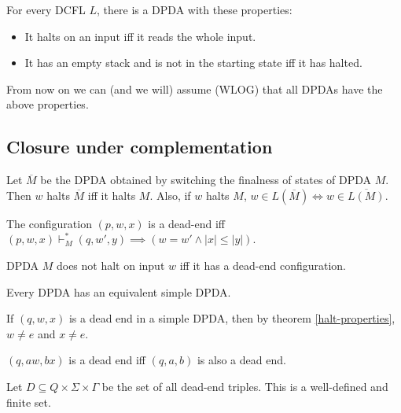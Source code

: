 \begin{theorem}
\label{halt-properties}
For every DCFL $L$,
there is a DPDA with these properties:
\begin{itemize}
\item It halts on an input iff it reads the whole input.
\item It has an empty stack and is not in the starting state iff it has halted.
\end{itemize}
\end{theorem}
From now on we can (and we will) assume (WLOG) that all DPDAs have the above properties.

\subsection{Closure under complementation}

\begin{theorem}
\label{dpda-complement}
Let $\overline{M}$ be the DPDA obtained by switching the finalness of states of DPDA $M$.
Then $w$ halts $\overline{M}$ iff it halts $M$.
Also, if $w$ halts $M$, $w \in L(\overline{M}) \iff w \in \overline{L(M)}$.
\end{theorem}

\begin{definition}
The configuration $(p, w, x)$ is a dead-end iff
$(p, w, x) \vdash_M^* (q, w', y) \implies (w = w' \wedge |x| \le |y|)$.
\end{definition}

\begin{theorem}
DPDA $M$ does not halt on input $w$ iff it has a dead-end configuration.
\end{theorem}

\begin{theorem}
Every DPDA has an equivalent simple DPDA.
\end{theorem}

If $(q, w, x)$ is a dead end in a simple DPDA, then by theorem \ref{halt-properties},
$w \neq e$ and $x \neq e$.
\begin{theorem}
$(q, aw, bx)$ is a dead end iff $(q, a, b)$ is also a dead end.
\end{theorem}

Let $D \subseteq Q \times \Sigma \times \Gamma$ be the set of all dead-end triples.
This is a well-defined and finite set.

